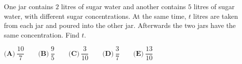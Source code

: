 One jar contains $2$ litres of sugar water and another contains $5$ litres of sugar water, with different sugar concentrations. At the same time, $t$ litres are taken from each jar and poured into the other jar. Afterwards the two jars have the same concentration. Find $t$.

$\textbf{(A)}\ \dfrac{10}{7}\qquad\textbf{(B)}\ \dfrac{9}{5}\qquad\textbf{(C)}\ \dfrac{3}{10}\qquad\textbf{(D)}\ \dfrac{3}{7}\qquad\textbf{(E)}\ \dfrac{13}{10}$
